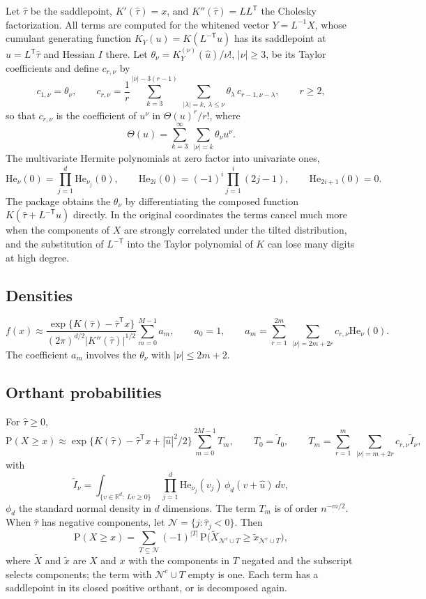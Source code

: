 \documentclass[11pt]{article}
\newcommand{\tp}{^{\mathsf T}}
\newcommand{\He}{\mathrm{He}}
\newcommand{\pr}{\mathrm{P}}
\begin{document}
Let $\hat\tau$ be the saddlepoint, $K'(\hat\tau)=x$, and $K''(\hat\tau)=LL\tp$ the Cholesky
factorization. All terms are computed for the whitened vector $Y=L^{-1}X$, whose cumulant generating
function $K_Y(u)=K(L^{-\mathsf T}u)$ has its saddlepoint at $\hat u=L\tp\hat\tau$ and Hessian $I$
there. Let $\theta_\nu=K_Y^{(\nu)}(\hat u)/\nu!$, $|\nu|\geq3$, be its Taylor coefficients and define
$c_{r,\nu}$ by
\[
c_{1,\nu}=\theta_\nu,\qquad
c_{r,\nu}=\frac1r\sum_{k=3}^{|\nu|-3(r-1)}\ \sum_{|\lambda|=k,\ \lambda\leq\nu}\theta_\lambda\,c_{r-1,\nu-\lambda},\qquad r\geq2,
\]
so that $c_{r,\nu}$ is the coefficient of $u^\nu$ in $\Theta(u)^r/r!$, where
\[
\Theta(u)=\sum_{k=3}^{\infty}\ \sum_{|\nu|=k}\theta_\nu u^\nu.
\]
The multivariate Hermite polynomials at zero factor into univariate ones,
\[
\He_\nu(0)=\prod_{j=1}^{d}\He_{\nu_j}(0),\qquad \He_{2i}(0)=(-1)^i\prod_{j=1}^{i}(2j-1),\qquad \He_{2i+1}(0)=0.
\]
The package obtains the $\theta_\nu$ by differentiating the composed function $K(\hat\tau+L^{-\mathsf T}u)$
directly. In the original coordinates the terms cancel much more when the components of $X$ are
strongly correlated under the tilted distribution, and the substitution of $L^{-\mathsf T}$ into the
Taylor polynomial of $K$ can lose many digits at high degree.

\subsection{Densities}

\[
f(x)\approx\frac{\exp\{K(\hat\tau)-\hat\tau\tp x\}}{(2\pi)^{d/2}|K''(\hat\tau)|^{1/2}}\sum_{m=0}^{M-1}a_m,\qquad
a_0=1,\qquad a_m=\sum_{r=1}^{2m}\ \sum_{|\nu|=2m+2r}c_{r,\nu}\He_\nu(0).
\]
The coefficient $a_m$ involves the $\theta_\nu$ with $|\nu|\leq2m+2$.

\subsection{Orthant probabilities}

For $\hat\tau\geq0$,
\[
\pr(X\geq x)\approx\exp\{K(\hat\tau)-\hat\tau\tp x+|\hat u|^2/2\}\sum_{m=0}^{2M-1}T_m,\qquad
T_0=\tilde I_0,\qquad T_m=\sum_{r=1}^{m}\ \sum_{|\nu|=m+2r}c_{r,\nu}\tilde I_\nu,
\]
with
\[
\tilde I_\nu=\int_{\{v\in\mathbb{R}^d:\ Lv\geq0\}}\ \prod_{j=1}^{d}\He_{\nu_j}(v_j)\,\phi_d(v+\hat u)\,dv,
\]
$\phi_d$ the standard normal density in $d$ dimensions. The term $T_m$ is of order $n^{-m/2}$.
When $\hat\tau$ has negative components, let $\mathcal N=\{j:\hat\tau_j<0\}$. Then
\[
\pr(X\geq x)=\sum_{T\subseteq\mathcal N}(-1)^{|T|}\,\pr\bigl(\tilde X_{\mathcal N^c\cup T}\geq\tilde x_{\mathcal N^c\cup T}\bigr),
\]
where $\tilde X$ and $\tilde x$ are $X$ and $x$ with the components in $T$ negated and the subscript
selects components; the term with $\mathcal N^c\cup T$ empty is one. Each term has a saddlepoint in
its closed positive orthant, or is decomposed again.
\end{document}
